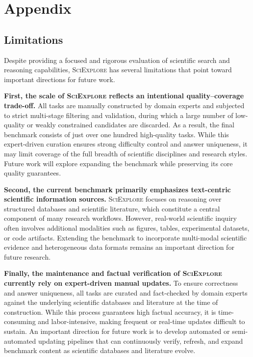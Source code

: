 
\clearpage



\section{Appendix}

\subsection{Limitations}
Despite providing a focused and rigorous evaluation of scientific search and reasoning capabilities, \textsc{SciExplore} has several limitations that point toward important directions for future work. 

\noindent\textbf{First, the scale of \textsc{SciExplore} reflects an intentional quality–coverage trade-off.} 
All tasks are manually constructed by domain experts and subjected to strict multi-stage filtering and validation, during which a large number of low-quality or weakly constrained candidates are discarded. 
As a result, the final benchmark consists of just over one hundred high-quality tasks.
While this expert-driven curation ensures strong difficulty control and answer uniqueness, it may limit coverage of the full breadth of scientific disciplines and research styles.
Future work will explore expanding the benchmark while preserving its core quality guarantees.

\noindent\textbf{Second, the current benchmark primarily emphasizes text-centric scientific information sources.}
\textsc{SciExplore} focuses on reasoning over structured databases and scientific literature, which constitute a central component of many research workflows.
However, real-world scientific inquiry often involves additional modalities such as figures, tables, experimental datasets, or code artifacts.
Extending the benchmark to incorporate multi-modal scientific evidence and heterogeneous data formats remains an important direction for future research.

\noindent\textbf{Finally, the maintenance and factual verification of \textsc{SciExplore} currently rely on expert-driven manual updates.}
To ensure correctness and answer uniqueness, all tasks are curated and fact-checked by domain experts against the underlying scientific databases and literature at the time of construction.
While this process guarantees high factual accuracy, it is time-consuming and labor-intensive, making frequent or real-time updates difficult to sustain.
An important direction for future work is to develop automated or semi-automated updating pipelines that can continuously verify, refresh, and expand benchmark content as scientific databases and literature evolve.



